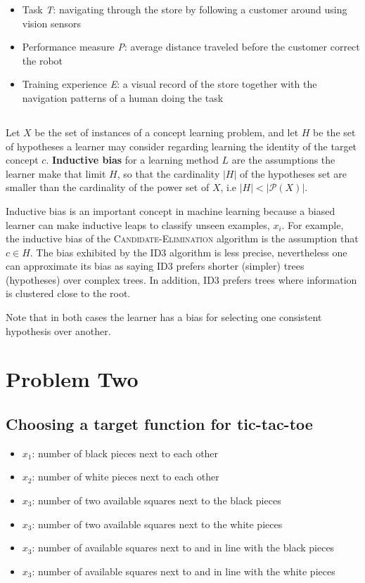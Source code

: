 \documentclass[00-main.tex]{subfiles}
\begin{document}
\begin{itemize}
  \item Task \textit{T}: navigating through the store by following a customer around using vision sensors
  \item Performance measure \textit{P}: average distance traveled before the customer correct the robot
  \item Training experience \textit{E}: a visual record of the store together with the navigation patterns
  of a human doing the task
\end{itemize}

\subsection{}
Let $X$ be the set of instances of a concept learning problem, and let $H$ be the set of hypotheses a learner
may consider regarding learning the identity of the target concept $c$. \textbf{Inductive bias} for a learning method $L$ are
the assumptions the learner make that limit $H$, so that the cardinality $|H|$ of the hypotheses 
set are smaller than the cardinality of the power set of $X$, i.e $|H| < | \mathcal P \left({X}\right) |$.

Inductive bias is an important concept in machine learning because a biased learner can make inductive leaps to 
classify unseen examples, $x_i$. For example, the inductive bias of the \textsc{Candidate-Elimination} algorithm is
the assumption that $c \in H$. The bias exhibited by the ID3 algorithm is less precise, nevertheless one can 
approximate its bias as saying ID3 prefers shorter (simpler) trees (hypotheses) over complex trees. In addition, ID3
prefers trees where information is clustered close to the root.

Note that in both cases the learner has a bias for selecting one consistent hypothesis over another.


\section{Problem Two}
\subsection{Choosing a target function for tic-tac-toe}

\begin{itemize}
  \item $ x_1 $: number of black pieces next to each other
  \item $ x_2 $: number of white pieces next to each other
  \item $ x_3 $: number of two available squares next to the black pieces
  \item $ x_3 $: number of two available squares next to the white pieces
  \item $ x_3 $: number of available squares next to and in line with the black pieces
  \item $ x_3 $: number of available squares next to and in line with the white pieces
\end{itemize}
\end{document}

